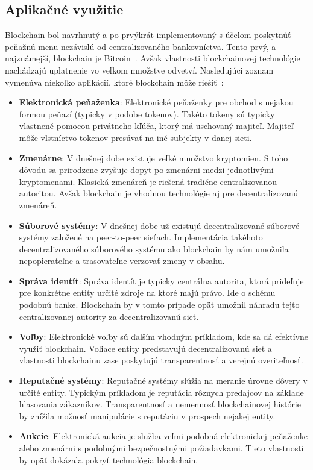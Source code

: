 \subsection{Aplikačné využitie}

Blockchain bol navrhnutý a po prvýkrát implementovaný s účelom poskytnúť peňažnú menu nezávislú od centralizovaného bankovníctva. Tento prvý, a najznámejší, blockchain je Bitcoin~\cite{satoshiBitcoin}. Avšak vlastnosti blockchainovej technológie nachádzajú uplatnenie vo veľkom množstve odvetví. Nasledujúci zoznam vymenúva niekoľko aplikácií, ktoré blockchain môže riešiť~\cite{homoliakBlockchain}:

\begin{itemize}
	\item \textbf{Elektronická peňaženka}: Elektronické peňaženky pre obchod s nejakou formou peňazí (typicky v podobe tokenov). Takéto tokeny sú typicky vlastnené pomocou privátneho kľúča, ktorý má uschovaný majiteľ. Majiteľ môže vlstníctvo tokenov presúvať na iné subjekty v danej sieti.
	\item \textbf{Zmenárne}: V dnešnej dobe existuje veľké množstvo kryptomien. S toho dôvodu sa prirodzene zvyšuje dopyt po zmenárni medzi jednotlivými kryptomenami. Klasická zmenáreň je riešená tradične centralizovanou autoritou. Avšak blockchain je vhodnou technológie aj pre decentralizovanú zmenáreň.
	\item \textbf{Súborové systémy}: V dnešnej dobe už existujú decentralizované súborové systémy založené na peer-to-peer sieťach. Implementácia takéhoto decentralizovaného súborového systému ako blockchain by nám umožnila nepopierateľne a trasovateľne verzovať zmeny v obsahu.
	\item \textbf{Správa identít}: Správa identít je typicky centrálna autorita, ktorá prideľuje pre konkrétne entity určité zdroje na ktoré majú právo. Ide o schému podobnú banke. Blockchain by v tomto prípade opäť umožnil náhradu tejto centralizovanej autority za decentralizovanú sieť.
	\item \textbf{Voľby}: Elektronické voľby sú ďalším vhodným príkladom, kde sa dá efektívne využiť blockchain. Voliace entity predstavujú decentralizovanú sieť a vlastnosti blockchainu zase poskytujú transparentnosť a verejnú overiteľnosť.
	\item \textbf{Reputačné systémy}: Reputačné systémy slúžia na meranie úrovne dôvery v určité entity. Typickým príkladom je reputácia rôznych predajcov na základe hlasovania zákazníkov. Transparentnosť a nemennosť blockchainovej histórie by znížila možnosť manipulácie s reputáciu v prospech nejakej entity.
	\item \textbf{Aukcie}: Elektronická aukcia je služba veľmi podobná elektronickej peňaženke alebo zmenárni s podobnými bezpečnostnými požiadavkami. Tieto vlastnosti by opäť dokázala pokryť technológia blockchain.
\end{itemize}

